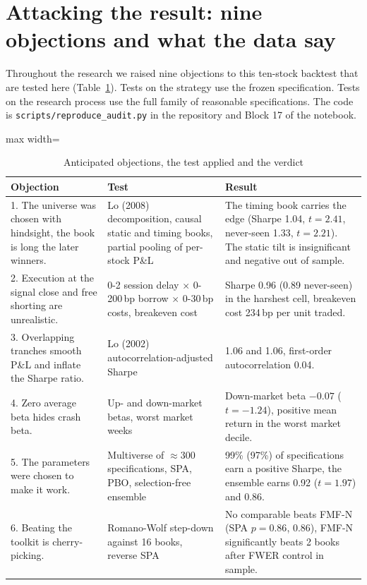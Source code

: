 \section{Attacking the result: nine objections and what the data say}\label{sec:objections}

Throughout the research we raised nine objections to this ten-stock backtest that are tested here (Table~\ref{tab:objections}). Tests on the strategy use the frozen specification. Tests on the research process use the full family of reasonable specifications. The code is \texttt{scripts/reproduce\_audit.py} in the repository and Block 17 of the notebook.

\begin{table}[t]
\centering\scriptsize
\caption{Anticipated objections, the test applied and the verdict}\label{tab:objections}
\begin{adjustbox}{max width=\textwidth}\begin{tabular}{p{}p{}p{}}
\toprule
Objection & Test & Result\\
\midrule
1. The universe was chosen with hindsight, the book is long the later winners. & Lo (2008) decomposition, causal static and timing books, partial pooling of per-stock P\&L & The timing book carries the edge (Sharpe 1.04, $t = 2.41$, never-seen 1.33, $t = 2.21$). The static tilt is insignificant and negative out of sample.\\
2. Execution at the signal close and free shorting are unrealistic. & 0-2 session delay $\times$ 0-200\,bp borrow $\times$ 0-30\,bp costs, breakeven cost & Sharpe 0.96 (0.89 never-seen) in the harshest cell, breakeven cost 234\,bp per unit traded.\\
3. Overlapping tranches smooth P\&L and inflate the Sharpe ratio. & Lo (2002) autocorrelation-adjusted Sharpe & 1.06 and 1.06, first-order autocorrelation 0.04.\\
4. Zero average beta hides crash beta. & Up- and down-market betas, worst market weeks & Down-market beta $-0.07$ ($t = -1.24$), positive mean return in the worst market decile.\\
5. The parameters were chosen to make it work. & Multiverse of $\approx$300 specifications, SPA, PBO, selection-free ensemble & 99\% (97\%) of specifications earn a positive Sharpe, the ensemble earns 0.92 ($t = 1.97$) and 0.86.\\
6. Beating the toolkit is cherry-picking. & Romano-Wolf step-down against 16 books, reverse SPA & No comparable beats FMF-N (SPA $p = 0.86$, 0.86), FMF-N significantly beats 2 books after FWER control in sample.\\

\end{tabular}
\end{adjustbox}
\end{table}

